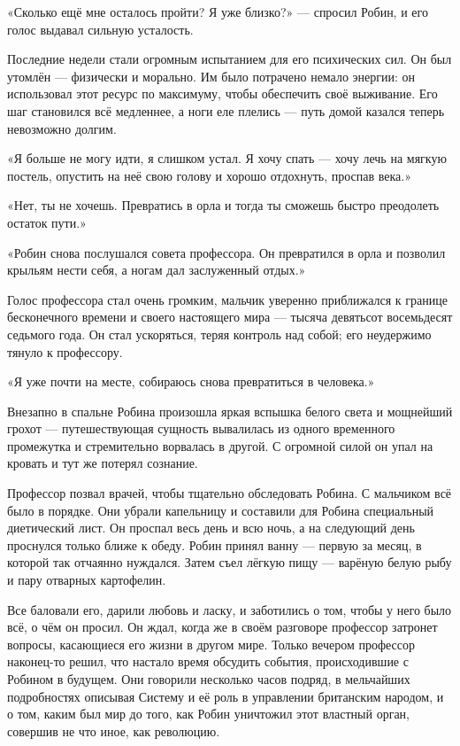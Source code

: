 \documentclass[a5paper, 9pt,
final, openany, twoside=true]{memoir}
\begin{document}
«Сколько ещё мне осталось пройти? Я уже близко?» — спросил Робин, и его голос выдавал сильную усталость.

Последние недели стали огромным испытанием для его психических сил. Он был утомлён — физически и морально. Им было потрачено немало энергии: он использовал этот ресурс по максимуму, чтобы обеспечить своё выживание. Его шаг становился всё медленнее, а ноги еле плелись — путь домой казался теперь невозможно долгим.

«Я больше не могу идти, я слишком устал. Я хочу спать — хочу лечь на мягкую постель, опустить на неё свою голову и хорошо отдохнуть, проспав века.»

«Нет, ты не хочешь. Превратись в орла и тогда ты сможешь быстро преодолеть остаток пути.» 

«Робин снова послушался совета профессора. Он превратился в орла и позволил крыльям нести себя, а ногам дал заслуженный отдых.»

Голос профессора стал очень громким, мальчик уверенно приближался к границе бесконечного времени и своего настоящего мира — тысяча девятьсот восемьдесят седьмого года. Он стал ускоряться, теряя контроль над собой; его неудержимо тянуло к профессору.

«Я уже почти на месте, собираюсь снова превратиться в человека.»

Внезапно в спальне Робина произошла яркая вспышка белого света и мощнейший грохот — путешествующая сущность вывалилась из одного временного промежутка и стремительно ворвалась в другой. С огромной силой он упал на кровать и тут же потерял сознание.\bigskip

Профессор позвал врачей, чтобы тщательно обследовать Робина. С мальчиком всё было в порядке. Они убрали капельницу и составили для Робина специальный диетический лист. Он проспал весь день и всю ночь, а на следующий день проснулся только ближе к обеду. Робин принял ванну — первую за месяц, в которой так отчаянно нуждался. Затем съел лёгкую пищу — варёную белую рыбу и пару отварных картофелин.

Все баловали его, дарили любовь и ласку, и заботились о том, чтобы у него было всё, о чём он просил. Он ждал, когда же в своём разговоре профессор затронет вопросы, касающиеся его жизни в другом мире. Только вечером профессор наконец-то решил, что настало время обсудить события, происходившие с Робином в будущем. Они говорили несколько часов подряд, в мельчайших подробностях описывая Систему и её роль в управлении британским народом, и о том, каким был мир до того, как Робин уничтожил этот властный орган, совершив не что иное, как революцию.
\end{document}
